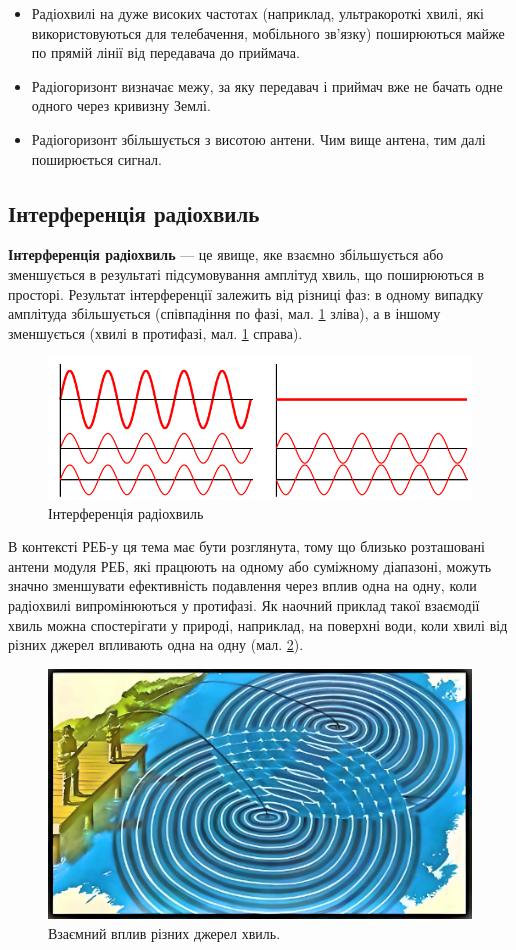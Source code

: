 \documentclass{article}
\begin{document}
\begin{itemize}[noitemsep, topsep=8pt]
\item Радіохвилі на дуже високих частотах (наприклад, ультракороткі хвилі, які використовуються для телебачення, мобільного зв'язку) поширюються майже по прямій лінії від передавача до приймача.
\item Радіогоризонт визначає межу, за яку передавач і приймач вже не бачать одне одного через кривизну Землі.
\item Радіогоризонт збільшується з висотою антени. Чим вище антена, тим далі поширюється сигнал.
\end{itemize}

\subsection{Інтерференція радіохвиль}

\textbf{Інтерференція радіохвиль} --- це явище, яке взаємно збільшується або зменшується в результаті підсумовування амплітуд хвиль, що поширюються в просторі. Результат інтерференції залежить від різниці фаз: в одному випадку амплітуда збільшується (співпадіння по фазі, мал. \ref{fig:interferense} зліва), а в іншому зменшується (хвилі в протифазі, мал. \ref{fig:interferense} справа).

\begin{figure}[h!]
\centering
\includegraphics[width=0.7\linewidth]{images/interferense.png}
\caption{\label{fig:interferense}Інтерференція радіохвиль}
\end{figure}

В контексті РЕБ-у ця тема має бути розглянута, тому що близько розташовані антени модуля РЕБ, які працюють на одному або суміжному діапазоні, можуть значно зменшувати ефективність подавлення через вплив одна на одну, коли радіохвилі випромінюються у протифазі. Як наочний приклад такої взаємодії хвиль можна спостерігати у природі, наприклад, на поверхні води, коли хвилі від різних джерел впливають одна на одну (мал. \ref{fig:two-emmitions}).

\begin{figure}[h!]
\centering
\includegraphics[width=0.6\linewidth]{images/two-emmitions.png}
\caption{\label{fig:two-emmitions}Взаємний вплив різних джерел хвиль.}
\end{figure}
\end{document}
